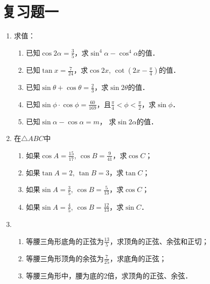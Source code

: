 \section*{复习题一}
\begin{enumerate}
    \item 求值：
\begin{enumerate}
    \item 已知$\cos2\alpha=\frac{3}{5}$，求$\sin^4\alpha-\cos^4\alpha$的值．
    \item 已知$\tan x=\frac{7}{24}$，求$\cos2x$, $\cot\left(2x-\frac{\pi}{4}\right)$的值．
    \item 已知$\sin\theta+\cos\theta=\frac{2}{3}$，求$\sin2\theta$的值．
    \item 已知$\sin\phi\cdot \cos\phi=\frac{60}{169}$，且$\frac{\pi}{4}<\phi<\frac{\pi}{2}$，求$\sin\phi$．
    \item 已知$\sin\alpha-\cos\alpha=m$， 求$\sin2\alpha$的值．
\end{enumerate}

\item 在$\triangle ABC$中
\begin{enumerate}
    \item 如果$\cos A=\frac{15}{17}$, $\cos B=\frac{9}{41}$，求$\cos C$；
    \item 如果$\tan A=2$, $\tan B=3$，求$\tan C$；
    \item 如果$\sin A=\frac{3}{5}$, $\cos B=\frac{5}{13}$，求$\cos C$；
    \item 如果$\sin A=\frac{4}{5}$, $\cos B=\frac{12}{13}$，求$\sin C$．
\end{enumerate}

\item \begin{enumerate}
    \item 等腰三角形底角的正弦为$\frac{13}{5}$，求顶角的正弦、余弦和正切；
    \item 等腰三角形顶角的余弦为$\frac{7}{25}$，求底角的正弦；
    \item 等腰三角形中，腰为底的2倍，求顶角的正弦、余弦．
\end{enumerate}


\end{enumerate}
